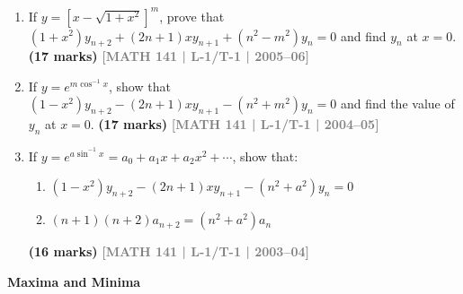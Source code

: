 \documentclass[12pt,a4paper]{article}
\newcommand{\yr}[1]{\hfill\textcolor{gray}{\small\textbf{[#1]}}}
\newcommand{\mk}[1]{\textcolor{orange!70!black}{\small\textbf{(#1 marks)}}}
\newcommand{\subtopic}[2]{%
  \vspace{10pt}
  \noindent\begin{tcolorbox}[colback=#1!8,colframe=#1,boxrule=0.6pt,arc=4pt,
    left=6pt,right=6pt,top=4pt,bottom=4pt]
    \small\bfseries\textcolor{#1}{#2}
  \end{tcolorbox}
  \vspace{2pt}
}
\begin{document}
\begin{enumerate}
\item If $y=[x-\sqrt{1+x^{2}}]^{m}$, prove that $(1+x^{2})y_{n+2}+(2n+1)xy_{n+1}+(n^{2}-m^{2})y_{n}=0$ and find $y_{n}$ at $x=0$.
\mk{17} \yr{MATH 141 | L-1/T-1 | 2005--06}

\item If $y=e^{m\cos^{-1}x}$, show that $(1-x^{2})y_{n+2}-(2n+1)xy_{n+1}-(n^{2}+m^{2})y_{n}=0$ and find the value of $y_{n}$ at $x=0$.
\mk{17} \yr{MATH 141 | L-1/T-1 | 2004--05}

\item If $y=e^{a\sin^{-1}x}=a_{0}+a_{1}x+a_{2}x^{2}+\cdots$, show that:
\begin{enumerate}
  \item $(1-x^{2})y_{n+2}-(2n+1)xy_{n+1}-(n^{2}+a^{2})y_{n}=0$
  \item $(n+1)(n+2)a_{n+2}=(n^{2}+a^{2})a_{n}$
\end{enumerate}
\mk{16} \yr{MATH 141 | L-1/T-1 | 2003--04}

\end{enumerate}

\subtopic{cA}{Maxima and Minima}
\label{sub:s1-maxmin}
\end{document}
